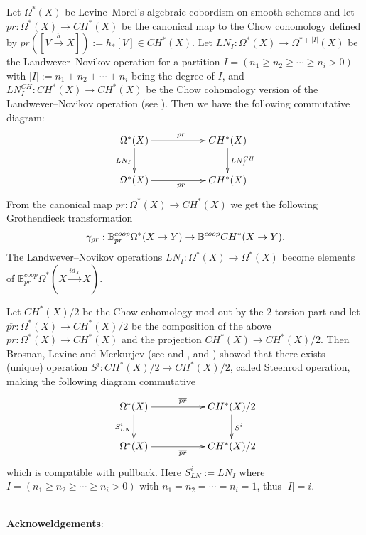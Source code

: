 \documentclass[a4paper]{amsart}
\begin{document}
\begin{ex} Let $\Omega^*(X)$ be Levine--Morel's algebraic cobordism on smooth schemes and let $pr: \Omega^*(X) \to CH^*(X)$ be the canonical map to the Chow cohomology defined by $pr([V \xrightarrow h X]):=h_*[V] \in CH^*(X)$. Let $LN_I: \Omega^*(X) \to \Omega^{* + |I|}(X)$ be the Landwever--Novikov operation for a partition $I = (n_1 \geq n_2 \geq \cdots \geq n_i>0)$ with $|I|:=n_1 + n_2 + \cdots + n_i$ being the degree of $I$, and $LN^{CH}_I: CH^*(X) \to CH^*(X)$ be the Chow cohomology version of the Landwever--Novikov operation (see \cite[\S 3]{Zain}). Then we have the following commutative diagram:
$$
\xymatrix
{
\Omega^*(X)  \ar[d]_{LN_I}\ar[rr]^{pr}  && CH^*(X) \ar[d]^{LN^{CH}_I}\\
\Omega^*(X)\ar[rr]_{pr} && CH^*(X)
}
$$
From the canonical map $pr: \Omega^*(X) \to CH^*(X)$ we get the following Grothendieck transformation
$$\gamma_{pr}: \mathbb B^{coop}_{pr} \Omega^*(X \to Y)  \to  \mathbb B^{coop} CH^*(X \to Y).$$
The Landwever--Novikov operations $LN_I: \Omega^*(X) \to \Omega^*(X)$ become elements of $\mathbb B^{coop}_{pr} \Omega^*(X \xrightarrow {id_X} X)$.  
\end{ex}
\begin{ex}\label{LN} Let $CH^*(X)/2$ be the Chow cohomology mod out by the 2-torsion part and
let $\overline{pr}:\Omega^*(X) \to CH^*(X)/2$ be the composition of the above $pr:\Omega^*(X) \to CH^*(X)$ and the projection $CH^*(X) \to CH^*(X)/2$. Then Brosnan, Levine and Merkurjev (see \cite{Vishik} and \cite{Bros}, \cite{Levine} and \cite{Merk} ) showed that there exists (unique) operation $S^i:CH^*(X)/2 \to CH^*(X)/2$, called Steenrod operation, making the following diagram commutative
$$
\xymatrix
{
\Omega^*(X)  \ar[d]_{S^i_{LN}}\ar[rr]^{\overline{pr}}  && CH^*(X)/2 \ar[d]^{S^i}\\
\Omega^*(X)\ar[rr]_{\overline{pr}} && CH^*(X)/2
}
$$
which is compatible with pullback. Here $S^i_{LN} := LN_I$ where  $I = (n_1 \geq n_2 \geq \cdots \geq n_i>0)$ with $n_1 =n_2 = \cdots =n_i=1$, thus $|I|=i$.\\\\
\end{ex}



\noindent
{\bf Acknoweldgements}:
\end{document}
